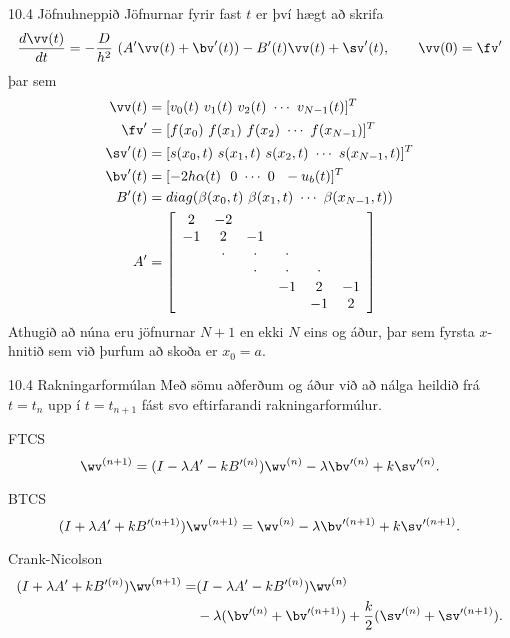   \begin{frame}{10.4 Jöfnuhneppið}
 Jöfnurnar fyrir fast $t$ er því hægt að skrifa
 $$ 
 \frac{d \vv(t)}{d t} =  -\frac{D}{h^2}\  (A'\vv(t) + \bv'(t)) 
 -B'(t)\vv(t) + \sv'(t), \qquad \vv(0)=\fv'
 $$ \pause
 þar sem 
 {\small \begin{align*}
  \vv(t) &= [v_0(t) \ v_1(t) \ v_2(t) \ \cdots \ v_{N-1}(t) ]^T\\
  \fv' &= [ f(x_0) \ f(x_1) \ f(x_2) \ \cdots \ f(x_{N-1}) ]^T\\
  \sv'(t) &= [ s(x_0,t) \ s(x_1,t) \ s(x_2,t) \ \cdots \ s(x_{N-1},t) ]^T\\
  \bv'(t) &= [ -2h\alpha(t) \ \ 0 \ \cdots \ 0 \ \ -u_b(t) ]^T \\
  B'(t) &= diag(\beta(x_0,t)\ \beta(x_1,t) \ \cdots \ \beta(x_{N-1},t) )\\
  A' &=  \left[\begin{array}{cccccc}
2 & -2 &   &   &   &  \\
-1 & 2 & -1 &   &   &  \\
  & \cdot & \cdot & \cdot &   &  \\
  &   & \cdot & \cdot & \cdot &  \\
  &   &  & -1 & 2 & -1\\
  &   &   &   & -1 & 2
      \end{array}\right] 
 \end{align*}} \pause
   Athugið að núna eru jöfnurnar $N+1$ en ekki $N$ eins og áður, þar sem fyrsta
   $x$-hnitið sem við þurfum að skoða er $x_0=a$.
  \end{frame}

\begin{frame}{10.4 Rakningarformúlan}
Með sömu aðferðum og áður við að nálga heildið frá $t=t_n$ upp í $t=t_{n+1}$
fást svo eftirfarandi rakningarformúlur.\pause

\begin{block}{FTCS}
   $$
     \wv^{(n+1)} = (I-\lambda A' - kB'^{(n)})\wv^{(n)} 
     - \lambda \bv'^{(n)} + k\sv'^{(n)}.
    $$\pause
\end{block}

\begin{block}{BTCS}
   $$
     (I+\lambda A' + kB'^{(n+1)})\wv^{(n+1)} = \wv^{(n)} 
     - \lambda \bv'^{(n+1)} + k\sv'^{(n+1)}.
    $$\pause
\end{block}

\begin{block}{Crank-Nicolson}
   \begin{align*}
     (I+\lambda A' + kB'^{(n)})\wv^{(n+1)}  = &
     (I-\lambda A' - kB'^{(n)})\wv^{(n)}\\ 
     & - \lambda (\bv'^{(n)}+\bv'^{(n+1)}) + \frac k2(\sv'^{(n)}+\sv'^{(n+1)}).
    \end{align*}\pause
\end{block}
\end{frame}

